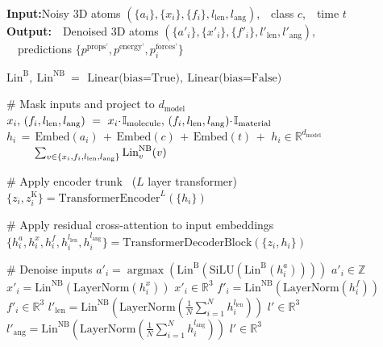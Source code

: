 \documentclass{article}
\DeclareMathOperator*{\argmax}{argmax}
\theoremstyle{plain}
\theoremstyle{definition}
\theoremstyle{remark}
\begin{document}
\begin{algorithm}[tb]
\scriptsize
\caption{Pseudocode for \textsc{TFT} model $\mathcal{T}$}
\label{algorithm:tft_model_pseudocode}
\textbf{Input:}\quad Noisy 3D atoms $(\{a_i\}, \{x_i\}, \{f_i\}, l_\text{len}, l_\text{ang})$,\ \ class $c$,\ \ time $t$ \\[2pt]
\textbf{Output:}\ \ Denoised 3D atoms $(\{a'_i\}, \{x'_i\}, \{f'_i\}, l'_\text{len}, l'_\text{ang})$, \\
\ \
predictions $\{p^\text{props'}, p^\text{energy'}, p_i^\text{forces'}\}$
\begin{algorithmic}[1]
  \STATE $\text{Lin}^\text{B},\ \text{Lin}^\text{NB}\ =\,\ \text{Linear(bias=True)},\ \text{Linear(bias=False)}$
  \item[] \textcolor{commentcolor}{\# Mask inputs and project to $d_{\text{model}}$}
  \STATE $x_i,\, (f_i, l_\text{len}, l_\text{ang})\ =\ x_i \mkern-4mu\cdot\mkern-2mu \mathbb{I}_\textup{molecule},\, (f_i, l_\text{len}, l_\text{ang}) \mkern-4mu\cdot\mkern-2mu \mathbb{I}_\textup{material}$
  \STATE $h_i \,=\, \text{Embed}(a_i) \,+\, \text{Embed}(c) \,+\, \text{Embed}(t) \,+$
  \hfill $h_i \in \mathbb{R}^{d_{\text{model}}}$ \\
  $\mkern44mu \sum_{v \in \{x_i, f_i, l_\text{len}, l_\text{ang}\}} \text{Lin}^\text{NB}_{v}(v)$

  \item[] \textcolor{commentcolor}{\# Apply encoder trunk \ ($L$ layer transformer)}
  \STATE $\{z_i,z_i^\text{K}\} = \text{TransformerEncoder}^L(\{h_i\})$

  \item[] \textcolor{commentcolor}{\# Apply residual cross-attention to input embeddings}
  \STATE $\{h_i^a, h_i^x, h_i^f, h_i^{l_\text{len}}, h_i^{l_\text{ang}}\} = \text{TransformerDecoderBlock}(\{z_i, h_i\})$

  \item[] \textcolor{commentcolor}{\# Denoise inputs}
  \STATE $a'_i = \argmax(\text{Lin}^\text{B}(\text{SiLU}(\text{Lin}^\text{B}(h_i^a))))$ \hfill $a'_i \in \mathbb{Z}$
  \STATE $x'_i = \text{Lin}^\text{NB}(\text{LayerNorm}(h_i^x))$ \hfill $x'_i \in \mathbb{R}^3$
  \STATE $f'_i = \text{Lin}^\text{NB}(\text{LayerNorm}(h_i^f))$ \hfill $f'_i \in \mathbb{R}^3$
  \STATE $l'_\text{len} = \text{Lin}^\text{NB}\left(\text{LayerNorm}\left(\frac{1}{N} \sum_{i=1}^{N} h_i^{l_\text{len}}\right)\right)$ \hfill $l' \in \mathbb{R}^3$
  \STATE $l'_\text{ang} = \text{Lin}^\text{NB}\left(\text{LayerNorm}\left(\frac{1}{N} \sum_{i=1}^{N} h_i^{l_\text{ang}}\right)\right)$ \hfill $l' \in \mathbb{R}^3$


\end{algorithmic}
\end{algorithm}
\end{document}
